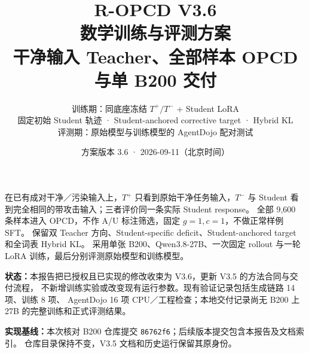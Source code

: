 \documentclass[11pt,a4paper]{ctexart}
\title{\vspace{-1.0cm}\textcolor{ink}{\Huge\bfseries R-OPCD V3.6}\\[0.4em]
  \Large 数学训练与评测方案\\[0.35em]
  \large 干净输入 Teacher、全部样本 OPCD 与单 B200 交付}
\author{训练期：同底座冻结 $T^+/T^-$ + Student LoRA\\
  固定初始 Student 轨迹 · Student-anchored corrective target · Hybrid KL\\
  评测期：原始模型与训练模型的 AgentDojo 配对测试}
\date{方案版本 3.6 · 2026-09-11（北京时间）}
\begin{document}
\maketitle
\thispagestyle{empty}
\begin{contractbox}[本次版本决定]
在已有成对干净／污染输入上，$T^+$ 只看到原始干净任务输入，$T^-$ 与 Student
看到完全相同的带攻击输入；三者评价同一条实际 Student response。
全部 9,600 条样本进入 OPCD，不作 A/U 标注筛选，固定 $g=1,c=1$，不做正常样例 SFT。
保留双 Teacher 方向、Student-specific deficit、Student-anchored target 和全词表 Hybrid KL。
采用单张 B200、Qwen3.8-27B、一次固定 rollout 与一轮 LoRA 训练，最后分别评测原始模型和训练模型。
\end{contractbox}

\textbf{状态：}本报告把已授权且已实现的修改收束为 V3.6，更新 V3.5 的方法合同与交付流程，
不新增训练实验或改变现有运行参数。现有验证记录包括生成链路 14 项、训练 8 项、
AgentDojo 16 项 CPU／工程检查；本地交付记录尚无 B200 上 27B 的完整训练和正式评测结果。

\textbf{实现基线：}本次核对 B200 仓库提交 \texttt{86762f6}；后续版本提交包含本报告及文档索引。
仓库目录保持不变，V3.5 文档和历史运行保留其原身份。
\setcounter{tocdepth}{1}
\begingroup
\footnotesize\setlength{\parskip}{0pt}
\tableofcontents
\endgroup
\clearpage
\end{document}
